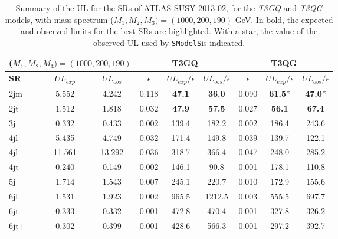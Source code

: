 \documentclass[preprint,number,sort&compress,twocolumn,3p]{elsstyarticle}
\newcommand{\SMO}{\texttt{SModelS\xspace}}
\begin{document}
\begin{table}[h]
	\centering
	\renewcommand\arraystretch{1.3} 
	\scriptsize
	\begin{tabular}{ l c c    c c c  |  c c c  }
		\toprule \toprule
		\multicolumn{3}{c}{($M_1,M_2,M_3) = (1000,200,190)$} & \multicolumn{3}{c}{ \textbf{T3GQ}} & \multicolumn{3}{c}{ \textbf{T3QG}} \\  \toprule 
		\textbf{SR} & $UL_{exp}$ & $UL_{obs}$ & $\epsilon$ &  $UL_{exp}/\epsilon$ & $UL_{obs}/\epsilon$ & $\epsilon$ & $UL_{exp}/ \epsilon$ & $UL_{obs}/ \epsilon$ \\
		2jm & 5.552 &  4.242 &  0.118  & \textbf{47.1} &  \textbf{36.0}  &  0.090 &  \textbf{61.5}*  & \textbf{47.0}*\\
		2jt  & 1.512  & 1.818 &  0.032  & \textbf{47.9} &  \textbf{57.5}  &  0.027 &  \textbf{56.1}  & \textbf{67.4} \\
		3j &  0.332 &  0.433  & 0.002 &  139.4 &  182.2  &  0.002 &  186.4 &  243.6 \\ 
		4jl  & 5.435 &  4.749  & 0.032  & 171.4  & 149.8  &  0.039 &  139.7  & 122.1 \\
		4jl-  & 11.561 &  13.292 &  0.036  & 318.7 &  366.4  &  0.047 &  248.0 &  285.2 \\
		4jt  & 0.240  & 0.149  & 0.002  & 146.1  & 90.8 &   0.001  & 178.1  & 110.8 \\
		5j  & 1.714  & 1.543  & 0.007 &  245.1 &  220.7  &  0.010  & 172.9  & 155.6 \\
		6jl  & 1.531  & 1.923  & 0.002  & 965.5 &  1212.5  & 0.003  & 555.5 &  697.7 \\
		6jt &  0.333  & 0.332 &  0.001  & 472.8  & 470.4 &  0.001 &  327.8  & 326.2 \\
		6jt+  & 0.302 &  0.399 &  0.001  & 428.6  & 566.3  & 0.001  & 297.2  & 392.7 \\
		\bottomrule \bottomrule
	\end{tabular}
	\caption{Summary of the UL for the SRs of ATLAS-SUSY-2013-02, for the \textit{T3GQ} and \textit{T3QG} models, with mass spectrum ($M_1,M_2,M_3) = (1000,200,190)$ GeV. In bold, the expected and observed limits for the best SRs are highlighted. With a star, the value of the observed UL used by \SMO is indicated.}
	\label{ATLAS02_UL}
\end{table}
\end{document}
